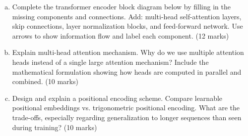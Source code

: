 \documentclass[12pt]{article}
\newcommand{\shortanswer}{\vspace{2cm}}          %
\newcommand{\longanswer}{\vspace{4cm}}           %
\begin{document}
\begin{enumerate}[(a)]
    \item Complete the transformer encoder block diagram below by filling in the missing components and connections. Add: multi-head self-attention layers, skip connections, layer normalization blocks, and feed-forward network. Use arrows to show information flow and label each component. \hfill (12 marks)
    
    \begin{center}
    \end{center}
    
    \shortanswer
    
    \item Explain multi-head attention mechanism. Why do we use multiple attention heads instead of a single large attention mechanism? Include the mathematical formulation showing how heads are computed in parallel and combined. \hfill (10 marks)
    
    \longanswer
    
    \item Design and explain a positional encoding scheme. Compare learnable positional embeddings vs. trigonometric positional encoding. What are the trade-offs, especially regarding generalization to longer sequences than seen during training? \hfill (10 marks)
    

\end{enumerate}
\end{document}
